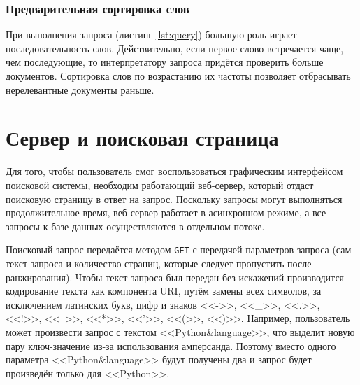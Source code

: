\subsubsection{Предварительная сортировка слов}
При выполнения запроса (листинг \ref{lst:query}) большую роль играет последовательность слов. Действительно, если первое слово встречается чаще, чем последующие, то интерпретатору запроса придётся проверить больше документов. Сортировка слов по возрастанию их частоты позволяет отбрасывать нерелевантные документы раньше.


\section{Сервер и поисковая страница}
Для того, чтобы пользователь смог воспользоваться графическим интерфейсом поисковой системы, необходим работающий веб-сервер, который отдаст поисковую страницу в ответ на запрос. Поскольку запросы могут выполняться продолжительное время, веб-сервер работает в асинхронном режиме, а все запросы к базе данных осуществляются в отдельном потоке.

Поисковый запрос передаётся методом \verb|GET| с передачей параметров запроса (сам текст запроса и количество страниц, которые следует пропустить после ранжирования). Чтобы текст запроса был передан без искажений производится кодирование текста как компонента URI, путём замены всех символов, за исключением латинских букв, цифр и знаков <<->>, <<\_>>, <<.>>, <<!>>, <<~>>, <<*>>, <<'>>, <<(>>, <<)>>. Например, пользователь может произвести запрос с текстом <<Python\&language>>, что выделит новую пару ключ-значение из-за использования амперсанда. Поэтому вместо одного параметра <<Python\&language>> будут получены два и запрос будет произведён только для <<Python>>.
